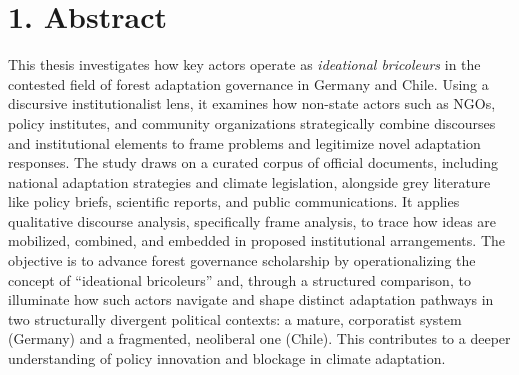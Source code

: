 \section*{1. Abstract}

This thesis investigates how key actors operate as \textit{ideational bricoleurs} in the contested field of forest adaptation governance in Germany and Chile. Using a discursive institutionalist lens, it examines how non-state actors such as NGOs, policy institutes, and community organizations strategically combine discourses and institutional elements to frame problems and legitimize novel adaptation responses. The study draws on a curated corpus of official documents, including national adaptation strategies and climate legislation, alongside grey literature like policy briefs, scientific reports, and public communications. It applies qualitative discourse analysis, specifically frame analysis, to trace how ideas are mobilized, combined, and embedded in proposed institutional arrangements. The objective is to advance forest governance scholarship by operationalizing the concept of ``ideational bricoleurs'' and, through a structured comparison, to illuminate how such actors navigate and shape distinct adaptation pathways in two structurally divergent political contexts: a mature, corporatist system (Germany) and a fragmented, neoliberal one (Chile). This contributes to a deeper understanding of policy innovation and blockage in climate adaptation.
